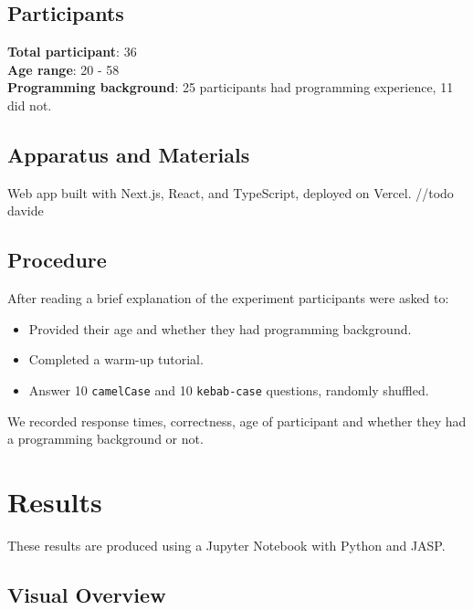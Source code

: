 \documentclass[unicode,11pt,a4paper,oneside,numbers=endperiod,openany]{scrartcl}
\begin{document}
\subsection{Participants}
\textbf{Total participant}: 36 \\
\textbf{Age range}: 20 - 58 \\
\textbf{Programming background}: 25 participants had programming experience, 11 did not.

\subsection{Apparatus and Materials}
Web app built with Next.js, React, and TypeScript, deployed on Vercel. //todo davide

\subsection{Procedure}
After reading a brief explanation of the experiment participants were asked to:
\begin{itemize}
    \item Provided their age and whether they had programming background.
    \item Completed a warm-up tutorial.
    \item Answer 10 \texttt{camelCase} and 10 \texttt{kebab-case} questions, randomly shuffled.
\end{itemize}

We recorded response times, correctness, age of participant and whether they had a programming background or not.

\section{Results}
These results are produced using a Jupyter Notebook with Python and JASP.

\subsection{Visual Overview}
\end{document}
